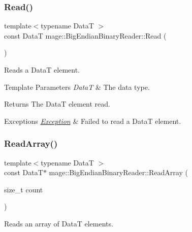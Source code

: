 \subsubsection{\texorpdfstring{Read()}{Read()}}
{\footnotesize\ttfamily template$<$typename DataT $>$ \\
const DataT mage\+::\+Big\+Endian\+Binary\+Reader\+::\+Read (\begin{DoxyParamCaption}{ }\end{DoxyParamCaption})\hspace{0.3cm}{\ttfamily [protected]}}

Reads a {\ttfamily DataT} element.


\begin{DoxyTemplParams}{Template Parameters}
{\em DataT} & The data type. \\
\hline
\end{DoxyTemplParams}
\begin{DoxyReturn}{Returns}
The {\ttfamily DataT} element read. 
\end{DoxyReturn}

\begin{DoxyExceptions}{Exceptions}
{\em \mbox{\hyperlink{classmage_1_1_exception}{Exception}}} & Failed to read a {\ttfamily DataT} element. \\
\hline
\end{DoxyExceptions}
\mbox{\label{classmage_1_1_big_endian_binary_reader_a534f06cc9b44757271595c614e8793d2}} 
\subsubsection{\texorpdfstring{Read\+Array()}{ReadArray()}}
{\footnotesize\ttfamily template$<$typename DataT $>$ \\
const DataT$\ast$ mage\+::\+Big\+Endian\+Binary\+Reader\+::\+Read\+Array (\begin{DoxyParamCaption}\item[{size\+\_\+t}]{count }\end{DoxyParamCaption})\hspace{0.3cm}{\ttfamily [protected]}}

Reads an array of {\ttfamily DataT} elements.


